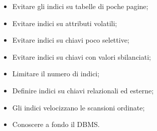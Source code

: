 \begin{itemize}
    \item Evitare gli indici su tabelle di poche pagine;
    \item Evitare indici su attributi volatili;
    \item Evitare indici su chiavi poco selettive;
    \item Evitare indici su chiavi con valori sbilanciati;
    \item Limitare il numero di indici;
    \item Definire indici su chiavi relazionali ed esterne;
    \item Gli indici velocizzano le scansioni ordinate;
    \item Conoscere a fondo il DBMS.
\end{itemize}